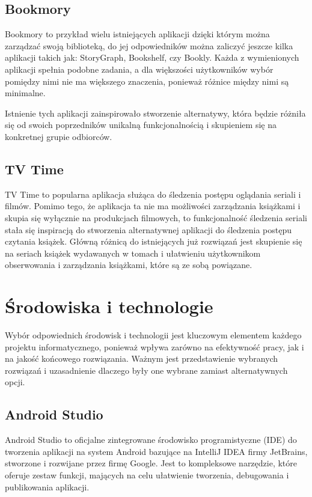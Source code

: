 \documentclass[12pt,twoside]{article}
\begin{document}
\subsection{Bookmory}

Bookmory to przykład wielu istniejących aplikacji dzięki którym można zarządzać swoją biblioteką, do jej
odpowiedników można zaliczyć jeszcze kilka aplikacji takich jak: StoryGraph, Bookshelf, czy Bookly.
Każda z wymienionych aplikacji spełnia podobne zadania, a dla większości użytkowników wybór pomiędzy nimi
nie ma większego znaczenia, ponieważ różnice między nimi są minimalne.

Istnienie tych aplikacji zainspirowało stworzenie alternatywy, która będzie różniła się od swoich
poprzedników unikalną funkcjonalnością i skupieniem się na konkretnej grupie odbiorców.

\subsection{TV Time}

TV Time to popularna aplikacja służąca do śledzenia postępu oglądania seriali i filmów. 
Pomimo tego, że aplikacja ta nie ma możliwości zarządzania książkami i skupia się wyłącznie na 
produkcjach filmowych, to funkcjonalność śledzenia seriali stała się inspiracją do stworzenia
alternatywnej aplikacji do śledzenia postępu czytania książek. Główną różnicą do 
istniejących już rozwiązań jest skupienie się na seriach książek wydawanych w tomach i ułatwieniu
użytkownikom obserwowania i zarządzania książkami, które są ze sobą powiązane.

\clearpage

\section{Środowiska i technologie}

Wybór odpowiednich środowisk i technologii jest kluczowym elementem każdego projektu informatycznego, 
ponieważ wpływa zarówno na efektywność pracy, jak i na jakość końcowego rozwiązania. Ważnym jest 
przedstawienie wybranych rozwiązań i uzasadnienie dlaczego były one wybrane zamiast alternatywnych
opcji.

\subsection{Android Studio}

Android Studio to oficjalne zintegrowane środowisko programistyczne (IDE) do tworzenia aplikacji na system
Android bazujące na IntelliJ IDEA firmy JetBrains, stworzone i rozwijane przez firmę Google. Jest to 
kompleksowe narzędzie, które oferuje zestaw funkcji, mających na celu ułatwienie tworzenia, debugowania i
publikowania aplikacji.
\end{document}

